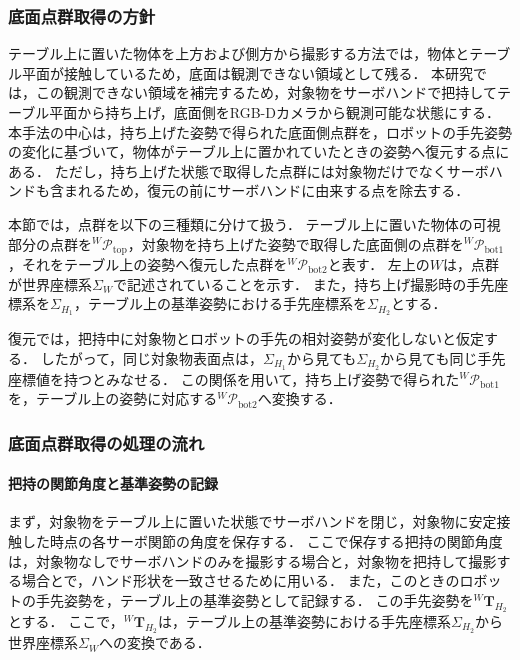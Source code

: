 \subsubsection{底面点群取得の方針}
\label{sec:system:bottom_acquisition_policy}

テーブル上に置いた物体を上方および側方から撮影する方法では，物体とテーブル平面が接触しているため，底面は観測できない領域として残る．
本研究では，この観測できない領域を補完するため，対象物をサーボハンドで把持してテーブル平面から持ち上げ，底面側をRGB-Dカメラから観測可能な状態にする．
本手法の中心は，持ち上げた姿勢で得られた底面側点群を，ロボットの手先姿勢の変化に基づいて，物体がテーブル上に置かれていたときの姿勢へ復元する点にある．
ただし，持ち上げた状態で取得した点群には対象物だけでなくサーボハンドも含まれるため，復元の前にサーボハンドに由来する点を除去する．

本節では，点群を以下の三種類に分けて扱う．
テーブル上に置いた物体の可視部分の点群を${}^{W}\mathcal{P}_{\mathrm{top}}$，対象物を持ち上げた姿勢で取得した底面側の点群を${}^{W}\mathcal{P}_{\mathrm{bot1}}$，それをテーブル上の姿勢へ復元した点群を${}^{W}\mathcal{P}_{\mathrm{bot2}}$と表す．
左上の$W$は，点群が世界座標系$\Sigma_W$で記述されていることを示す．
また，持ち上げ撮影時の手先座標系を$\Sigma_{H_1}$，テーブル上の基準姿勢における手先座標系を$\Sigma_{H_2}$とする．

復元では，把持中に対象物とロボットの手先の相対姿勢が変化しないと仮定する．
したがって，同じ対象物表面点は，$\Sigma_{H_1}$から見ても$\Sigma_{H_2}$から見ても同じ手先座標値を持つとみなせる．
この関係を用いて，持ち上げ姿勢で得られた${}^{W}\mathcal{P}_{\mathrm{bot1}}$を，テーブル上の姿勢に対応する${}^{W}\mathcal{P}_{\mathrm{bot2}}$へ変換する．

\subsubsection{底面点群取得の処理の流れ}
\label{sec:system:bottom_acquisition_flow}

\paragraph{把持の関節角度と基準姿勢の記録}
まず，対象物をテーブル上に置いた状態でサーボハンドを閉じ，対象物に安定接触した時点の各サーボ関節の角度を保存する．
ここで保存する把持の関節角度は，対象物なしでサーボハンドのみを撮影する場合と，対象物を把持して撮影する場合とで，ハンド形状を一致させるために用いる．
また，このときのロボットの手先姿勢を，テーブル上の基準姿勢として記録する．
この手先姿勢を${}^{W}\bm{T}_{H_2}$とする．
ここで，${}^{W}\bm{T}_{H_2}$は，テーブル上の基準姿勢における手先座標系$\Sigma_{H_2}$から世界座標系$\Sigma_W$への変換である．

